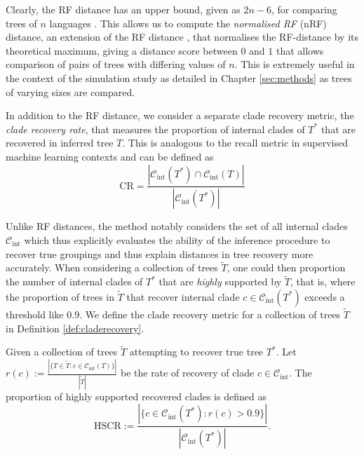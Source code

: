 Clearly, the RF distance has an upper bound, given as $2n-6$, for comparing trees of $n$ languages \cite{Steel1993}. This allows us to compute the \textit{normalised RF} (nRF) distance, an extension of the RF distance \cite{Branco2024, Steel1993}, that normalises the RF-distance by its theoretical maximum, giving a distance score between $0$ and $1$ that allows comparison of pairs of trees with differing values of $n$. This is extremely useful in the context of the simulation study as detailed in Chapter \ref{sec:methods} as trees of varying sizes are compared.

In addition to the RF distance, we consider a separate clade recovery metric, the \textit{clade recovery rate}, that measures the proportion of internal clades of $T^*$ that are recovered in inferred tree $T$. This is analogous to the recall metric in supervised machine learning contexts and can be defined as
\begin{equation}
\label{eq:claderecovery}
    \text{CR} = \frac{|\mathcal{C}_{\text{int}}(T^*) \cap \mathcal{C}_{\text{int}}(T)|}{|\mathcal{C}_{\text{int}}(T^*)|}
\end{equation}

Unlike RF distances, the method notably considers the set of all internal clades $\mathcal{C}_{\text{int}}$ which thus explicitly evaluates the ability of the inference procedure to recover true groupings and thus explain distances in tree recovery more accurately. When considering a collection of trees $\tilde{T}$, one could then proportion the number of internal clades of $T^*$ that are \textit{highly} supported by $\tilde{T}$, that is, where the proportion of trees in $\tilde{T}$ that recover internal clade $c \in \mathcal{C}_{\text{int}}(T^*)$ exceeds a threshold like $0.9$. We define the clade recovery metric for a collection of trees $\tilde{T}$ in Definition \ref{def:claderecovery}.

\begin{definition}
\label{def:claderecovery}
    Given a collection of trees $\tilde{T}$ attempting to recover true tree $T^*$. Let $r(c) := \frac{|\{T\in\tilde{T}:c \in \mathcal{C}_{\text{int}}(T)\}|}{|\tilde{T}|}$ be the rate of recovery of clade $c \in \mathcal{C}_{\text{int}}$. The proportion of highly supported recovered clades is defined as
    \begin{equation}
        \text{HSCR} := \frac{|\{c \in \mathcal{C}_{\text{int}}(T^*): r(c) > 0.9 \} |}{|\mathcal{C}_{\text{int}}(T^*)|}.
    \end{equation}
    
\end{definition}

